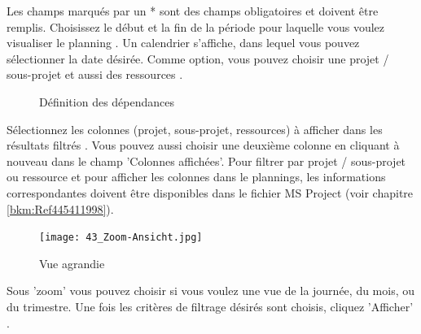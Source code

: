 Les champs marqués par un * sont des champs obligatoires et doivent être remplis. Choisissez le début et la fin de la période pour laquelle vous voulez visualiser le planning . Un calendrier s'affiche, dans lequel vous pouvez sélectionner la date désirée. Comme option, vous pouvez choisir une projet / sous-projet  et aussi des ressources .

\begin{figure}[H]
\caption{Définition des dépendances}
\end{figure}


Sélectionnez les colonnes (projet, sous-projet, ressources) à afficher dans les résultats filtrés . Vous pouvez aussi choisir une deuxième colonne en cliquant à nouveau dans le champ 'Colonnes affichées'. Pour filtrer par projet / sous-projet ou ressource et pour afficher les colonnes dans le plannings, les informations correspondantes doivent être disponibles dans le fichier MS Project (voir chapitre \ref{bkm:Ref445411998}).


\vspace{\baselineskip}

\begin{figure}
  \vspace{-30pt}
  \begin{center}
    \texttt{[image: 43\_Zoom-Ansicht.jpg]}
  \end{center}
  \vspace{-20pt}
  \caption{Vue agrandie}
  \vspace{-10pt}
\end{figure}
Sous 'zoom'  vous pouvez choisir si vous voulez une vue de la journée, du mois, ou du trimestre. Une fois les critères de filtrage désirés sont choisis, cliquez 'Afficher' .

